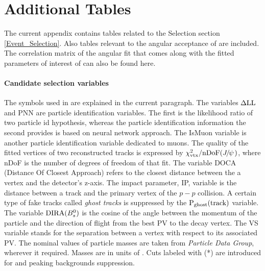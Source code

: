 
\chapter{Additional Tables}
\label{AdditionalTables}

The current appendix contains tables related to the Selection section \ref{Event_Selection}.
Also tables relevant to the angular acceptance of  are included.
The correlation matrix of the angular fit that comes along with the fitted parameters
of interest of  can also be found here.

\subsubsection{Candidate selection variables}
The symbols used in  are explained in the current paragraph.
The variables ${\rm \Delta LL}$ and PNN are particle identification variables. The first is the
likelihood ratio of two particle id hypothesis, whereas the particle identification information
  the second provides is based on neural network approach. The IsMuon variable is another
particle identification variable dedicated to muons. The quality of the fitted vertices
of two reconstructed tracks is expressed by $\chi^2_{\rm vtx}/{\rm nDoF}({J\mskip -3mu/\mskip -2mu\psi\mskip 2mu})$, where nDoF
is the number of degrees of freedom of that fit. The variable DOCA (Distance Of Closest Approach)
refers to the closest distance between the a vertex and the detector's z-axis. The impact parameter,
IP, variable is the distance between a track and the primary vertex of the $p-p$ collision.
A certain type of fake tracks called {\it ghost tracks} is suppressed by the $\text{P}_{\rm ghost}(\rm track)$
variable. The variable ${\rm DIRA}(B^0_s)$ is the cosine of the angle between the momentum of the \Bs particle
and the direction of flight from the best PV to the \Bs decay vertex. The VS variable stands for
the separation between a vertex with respect to its associated PV. The nominal values of particle
masses are taken from {\it Particle Data Group}\cite{PDG}, wherever it required. Masses are in units of \mevcc. Cuts labeled with (*) are introduced
for \LbJpsipK and \LbJpsippi peaking backgrounds suppression.

